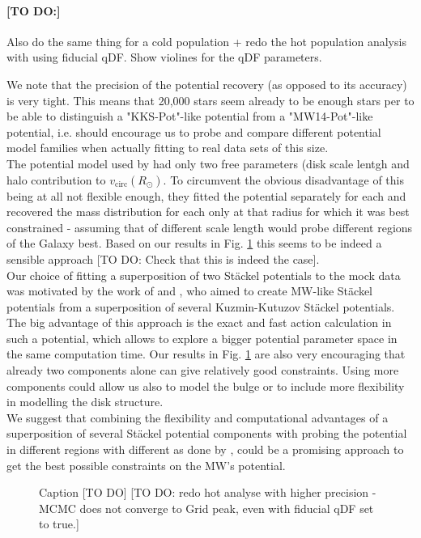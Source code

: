 \paragraph{[TO DO:]} Also do the same thing for a cold population + redo the hot population analysis with using fiducial qDF. Show violines for the qDF parameters.





We note that the precision of the potential recovery (as opposed to its accuracy) is very tight. This means that 20,000 stars seem already to be enough stars per \MAP to be able to distinguish a "KKS-Pot"-like potential from a "MW14-Pot"-like potential, i.e. should encourage us to probe and compare different potential model families when actually fitting to real data sets of this size.
\\The potential model used by \citet{bov13} had only two free parameters (disk scale lentgh and halo contribution to $v_\text{circ}(R_\odot)$. To circumvent the obvious disadvantage of this being at all not flexible enough, they fitted the potential separately for each \MAP and recovered the mass distribution for each \MAP only at that radius for which it was best constrained - assuming that \MAPs of different scale length would probe different regions of the Galaxy best. Based on our results in Fig. \ref{fig:MW14vsKKS2SphFlex} this seems to be indeed a sensible approach [TO DO: Check that this is indeed the case].
\\Our choice of fitting a superposition of two St\"{a}ckel potentials to the mock data was motivated by the work of \citet{bat94} and \citet{fam03}, who aimed to create MW-like St\"{a}ckel potentials from a superposition of several Kuzmin-Kutuzov St\"{a}ckel potentials. The big advantage of this approach is the exact and fast action calculation in such a potential, which allows to explore a bigger potential parameter space in the same computation time. Our results in Fig. \ref{fig:MW14vsKKS2SphFlex} are also very encouraging that already two components alone can give relatively good constraints. Using more components could allow us also to model the bulge or to include more flexibility in modelling the disk structure.
\\We suggest that combining the flexibility and computational advantages of a superposition of several St\"{a}ckel potential components with probing the potential in different regions with different \MAPs as done by \citet{bov13}, could be a promising approach to get the best possible constraints on the MW's potential.




\begin{figure}
\caption{Caption [TO DO] [TO DO: redo hot analyse with higher precision - MCMC does not converge to Grid peak, even with fiducial qDF set to true.]}
\label{fig:MW14vsKKS2SphFlex}
\end{figure}






